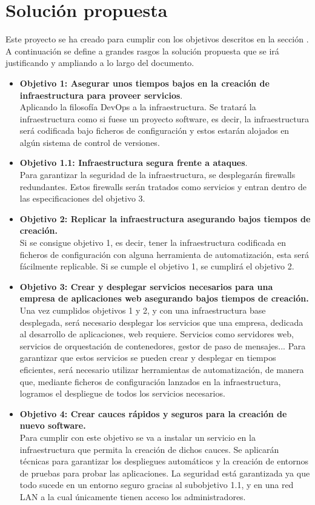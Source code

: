 \section{Solución propuesta}
\begin{text}
	Este proyecto se ha creado para cumplir con los objetivos descritos en la sección . A continuación se define a grandes rasgos la solución propuesta que se irá justificando y ampliando a lo largo del documento. \\
	\begin{itemize}
		\item \textbf{Objetivo 1: Asegurar unos tiempos bajos en la creación de infraestructura para proveer servicios}. \\ Aplicando la filosofía DevOps a la infraestructura. Se tratará la infraestructura como si fuese un proyecto software, es decir, la infraestructura será codificada bajo ficheros de configuración y estos estarán alojados en algún sistema de control de versiones.
		\item \textbf{Objetivo 1.1: Infraestructura segura frente a ataques}. \\ Para garantizar la seguridad de la infraestructura, se desplegarán firewalls redundantes. Estos firewalls serán tratados como servicios y entran dentro de las especificaciones del objetivo 3.
		\item \textbf{Objetivo 2: Replicar la infraestructura asegurando bajos tiempos de creación.} \\
		Si se consigue objetivo 1, es decir, tener la infraestructura codificada en ficheros de configuración con alguna herramienta de automatización, esta será fácilmente replicable. Si se cumple el objetivo 1, se cumplirá el objetivo 2.
		\item \textbf{Objetivo 3: Crear y desplegar servicios necesarios para una empresa de aplicaciones web asegurando bajos tiempos de creación.} \\
		Una vez cumplidos objetivos 1 y 2, y con una infraestructura base desplegada, será necesario desplegar los servicios que una empresa, dedicada al desarrollo de aplicaciones, web requiere. Servicios como servidores web, servicios de orquestación de contenedores, gestor de paso de mensajes... Para garantizar que estos servicios se pueden crear y desplegar en tiempos eficientes, será necesario utilizar herramientas de automatización, de manera que, mediante ficheros de configuración lanzados en la infraestructura, logramos el despliegue de todos los servicios necesarios.
		\item \textbf{Objetivo 4: Crear cauces rápidos y seguros para la creación de nuevo software.} \\
		Para cumplir con este objetivo se va a instalar un servicio en la infraestructura que permita la creación de dichos cauces. Se aplicarán técnicas para garantizar los despliegues automáticos y la creación de entornos de pruebas para probar las aplicaciones. La seguridad está garantizada ya que todo sucede en un entorno seguro gracias al subobjetivo 1.1, y en una red LAN a la cual únicamente tienen acceso los administradores.
	\end{itemize}
\end{text}

